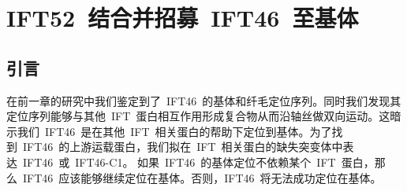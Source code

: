 \chapter{IFT52\ 结合并招募\ IFT46\ 至基体}
\renewcommand{\leftmark}{第五章\quad IFT52\ 结合并招募\ IFT46\ 至基体}
\section{引言}
在前一章的研究中我们鉴定到了\ IFT46\ 的基体和纤毛定位序列。同时我们发现其定位序列能够与其他\ IFT\ 蛋白相互作用形成复合物从而沿轴丝做双向运动。这暗示我们\ IFT46\ 是在其他\ IFT\ 相关蛋白的帮助下定位到基体。为了找到\ IFT46\ 的上游运载蛋白，我们拟在\ IFT\ 相关蛋白的缺失突变体中表达\ IFT46\ 或\ IFT46-C1。 如果\ IFT46\ 的基体定位不依赖某个\ IFT\ 蛋白，那么\ IFT46\ 应该能够继续定位在基体。否则，IFT46\ 将无法成功定位在基体。

